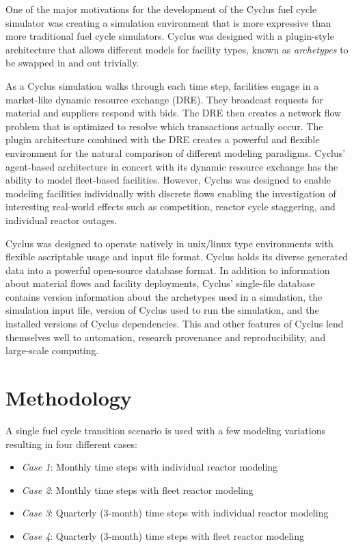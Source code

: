 \documentclass{style}
\begin{document}
One of the major motivations for the development of the Cyclus fuel cycle
simulator \cite{cyclus_2015} was creating a simulation environment that is
more expressive than more traditional fuel cycle simulators.  Cyclus was
designed with a plugin-style architecture that allows different models for
facility types, known as \emph{archetypes} to be swapped in and out trivially.

As a Cyclus simulation walks through each time step, facilities engage in a
market-like dynamic resource exchange (DRE).  They broadcast requests for
material and suppliers respond with bids. The DRE then creates a network flow
problem that is optimized to resolve which transactions actually occur.  The
plugin architecture combined with the DRE creates a powerful and flexible
environment for the natural comparison of different modeling paradigms.
Cyclus' agent-based architecture in concert with its dynamic resource exchange
has the ability to model fleet-based facilities.  However, Cyclus was designed
to enable modeling facilities individually with discrete flows enabling the
investigation of interesting real-world effects such as competition, reactor
cycle staggering, and individual reactor outages. 

Cyclus was designed to operate natively in unix/linux type environments with
flexible ascriptable usage and input file format.  Cyclus holds its diverse
generated data into a powerful open-source database format.  In addition to
information about material flows and facility deployments, Cyclus' single-file
database contains version information about the archetypes used in a
simulation, the simulation input file, version of Cyclus used to run the
simulation, and the installed versions of Cyclus dependencies. This and other
features of Cyclus lend themselves well to automation, research provenance and
reproducibility, and large-scale computing.

\section{Methodology}

A single fuel cycle transition scenario is used with a few modeling variations
resulting in four different cases:

\begin{itemize}

    \item \emph{Case 1}: Monthly time steps with individual reactor modeling
    \item \emph{Case 2}: Monthly time steps with fleet reactor modeling
    \item \emph{Case 3}: Quarterly (3-month) time steps with individual reactor modeling
    \item \emph{Case 4}: Quarterly (3-month) time steps with fleet reactor modeling

\end{itemize}
\end{document}
